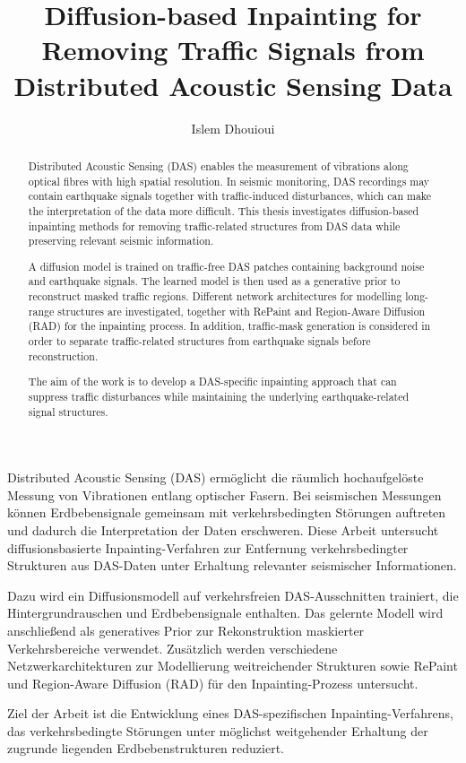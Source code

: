 \documentclass[english,ba]{tudo-sse-thesis}
\title{Diffusion-based Inpainting for Removing Traffic Signals from Distributed Acoustic Sensing Data}
\author{Islem Dhouioui}
\begin{document}
\maketitle


\begin{abstract}

Distributed Acoustic Sensing (DAS) enables the measurement of vibrations
along optical fibres with high spatial resolution. In seismic monitoring,
DAS recordings may contain earthquake signals together with
traffic-induced disturbances, which can make the interpretation of the
data more difficult. This thesis investigates diffusion-based inpainting
methods for removing traffic-related structures from DAS data while
preserving relevant seismic information.

A diffusion model is trained on traffic-free DAS patches containing
background noise and earthquake signals. The learned model is then used
as a generative prior to reconstruct masked traffic regions. Different
network architectures for modelling long-range structures are investigated,
together with RePaint and Region-Aware Diffusion (RAD) for the inpainting
process. In addition, traffic-mask generation is considered in order to
separate traffic-related structures from earthquake signals before
reconstruction.

The aim of the work is to develop a DAS-specific inpainting approach that
can suppress traffic disturbances while maintaining the underlying
earthquake-related signal structures.

\end{abstract}

\begin{abstract-ger}

Distributed Acoustic Sensing (DAS) ermöglicht die räumlich hochaufgelöste
Messung von Vibrationen entlang optischer Fasern. Bei seismischen
Messungen können Erdbebensignale gemeinsam mit verkehrsbedingten
Störungen auftreten und dadurch die Interpretation der Daten erschweren.
Diese Arbeit untersucht diffusionsbasierte Inpainting-Verfahren zur
Entfernung verkehrsbedingter Strukturen aus DAS-Daten unter Erhaltung
relevanter seismischer Informationen.

Dazu wird ein Diffusionsmodell auf verkehrsfreien DAS-Ausschnitten
trainiert, die Hintergrundrauschen und Erdbebensignale enthalten.
Das gelernte Modell wird anschließend als generatives Prior zur
Rekonstruktion maskierter Verkehrsbereiche verwendet. Zusätzlich werden
verschiedene Netzwerkarchitekturen zur Modellierung weitreichender
Strukturen sowie RePaint und Region-Aware Diffusion (RAD) für den
Inpainting-Prozess untersucht.

Ziel der Arbeit ist die Entwicklung eines DAS-spezifischen
Inpainting-Verfahrens, das verkehrsbedingte Störungen unter möglichst
weitgehender Erhaltung der zugrunde liegenden Erdbebenstrukturen
reduziert.

\end{abstract-ger}
\end{document}

